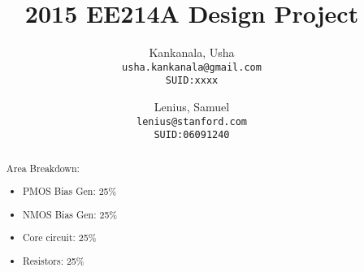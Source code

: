 \documentclass[12pt,english]{article}
\begin{document}

\setcounter{page}{0}



\author{
  Kankanala, Usha\\
  \texttt{usha.kankanala@gmail.com}\\
  \texttt{SUID:xxxx}
  \and
  Lenius, Samuel\\
  \texttt{lenius@stanford.com}\\
  \texttt{SUID:06091240}
}

\title{2015 EE214A Design Project}

\maketitle


\begin{abstract}
  Area Breakdown:
  \begin{addmargin}[1em]{0em}
  \begin{itemize}
    \item PMOS Bias Gen: 25\%
    \item NMOS Bias Gen: 25\%
    \item Core circuit: 25\%
    \item Resistors: 25\%
  \end{itemize}
  \end{addmargin}
\end{abstract}

\pagebreak

\end{document}
